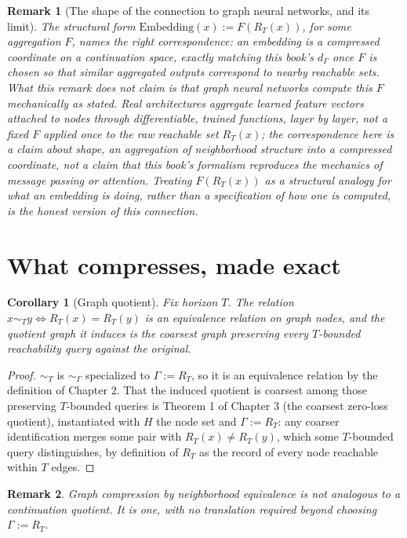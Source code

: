 \documentclass[11pt]{report}
\newtheorem{remark}{Remark}[chapter]
\newtheorem{corollary}{Corollary}[chapter]
\begin{document}
\begin{remark}[The shape of the connection to graph neural networks, and its limit]
The structural form $\mathrm{Embedding}(x) := F(R_T(x))$, for some
aggregation $F$, names the right correspondence: an embedding is a
compressed coordinate on a continuation space, exactly matching this
book's $d_\Gamma$ once $F$ is chosen so that similar aggregated
outputs correspond to nearby reachable sets. What this remark does
not claim is that graph neural networks compute this $F$ mechanically
as stated. Real architectures aggregate learned feature vectors
attached to nodes through differentiable, trained functions, layer by
layer, not a fixed $F$ applied once to the raw reachable set $R_T(x)$;
the correspondence here is a claim about shape, an aggregation of
neighborhood structure into a compressed coordinate, not a claim that
this book's formalism reproduces the mechanics of message passing or
attention. Treating $F(R_T(x))$ as a structural analogy for what an
embedding is doing, rather than a specification of how one is
computed, is the honest version of this connection.
\end{remark}

\section*{What compresses, made exact}

\begin{corollary}[Graph quotient]
\label{cor:graphquotient}
Fix horizon $T$. The relation $x \sim_T y \iff R_T(x) = R_T(y)$ is an
equivalence relation on graph nodes, and the quotient graph it induces
is the coarsest graph preserving every $T$-bounded reachability query
against the original.
\end{corollary}
\begin{proof}
$\sim_T$ is $\sim_\Gamma$ specialized to $\Gamma := R_T$, so it is an
equivalence relation by the definition of Chapter 2. That the induced
quotient is coarsest among those preserving $T$-bounded queries is
Theorem 1 of Chapter 3 (the coarsest zero-loss quotient), instantiated
with $H$ the node set and $\Gamma := R_T$: any coarser identification
merges some pair with $R_T(x) \neq R_T(y)$, which some $T$-bounded
query distinguishes, by definition of $R_T$ as the record of every
node reachable within $T$ edges.
\end{proof}

\begin{remark}
Graph compression by neighborhood equivalence is not analogous to a
continuation quotient. It is one, with no translation required beyond
choosing $\Gamma := R_T$.
\end{remark}
\end{document}
